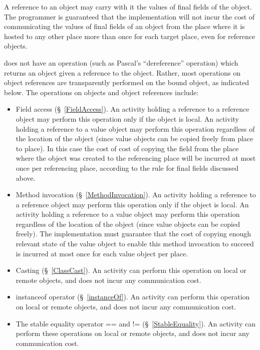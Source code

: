 A reference to an object may carry with it the values of final fields
of the object. The programmer is guaranteed that the implementation
will not incur the cost of communicating the values of final fields of
an object from the place where it is hosted to any other place more
than once for each target place, even for reference objects.

{}\Xten{} does not have an operation (such as Pascal's ``dereference''
operation) which returns an object given a reference to the
object. Rather, most operations on object references are transparently
performed on the bound object, as indicated below. The operations on
objects and object references include:
\begin{itemize}

{}\item Field access (\S~\ref{FieldAccess}). An activity holding a
reference to a reference object may perform this operation only if the
object is local.  An activity holding a reference to a value object
may perform this operation regardless of the location of the object
(since value objects can be copied freely from place to place). In
this case the cost of cost of copying the field from the place where
the object was created to the referencing place will be incurred at
most once per referencing place, according to the rule for final
fields discussed above.

\item Method invocation (\S~\ref{MethodInvocation}). 
An activity holding a reference to a reference object may perform this
operation only if the object is local.  An activity holding a
reference to a value object may perform this operation regardless of
the location of the object (since value objects can be copied
freely). The \Xten{} implementation must guarantee that the cost of
copying enough relevant state of the value object to enable this
method invocation to succeed is incurred at most once for each value
object per place.

{}\item Casting (\S~\ref{ClassCast}).  An activity can perform this
operation on local or remote objects, and does not incur any
communication cost.

{}\item {\cf instanceof} operator (\S~\ref{instanceOf}). 
An activity can perform this
operation on local or remote objects, and does not incur any
communication cost.

\item The stable equality operator {\cf ==} and {\cf !=} (\S~\ref{StableEquality}). An activity can perform these operations on local or remote objects,
and does not incur any communication cost.

\end{itemize}

